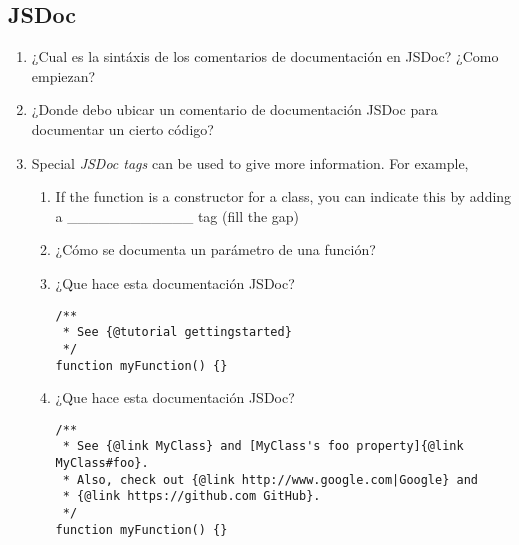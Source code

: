 \subsection{JSDoc}\label{jsdoc}

\begin{enumerate}
\def\labelenumi{\arabic{enumi}.}
\itemsep1pt\parskip0pt
\item
  ¿Cual es la sintáxis de los comentarios de documentación en JSDoc?
  ¿Como empiezan?
\item
  ¿Donde debo ubicar un comentario de documentación JSDoc para
  documentar un cierto código?
\item
  Special \emph{JSDoc tags} can be used to give more information. For
  example,

  \begin{enumerate}
  \def\labelenumii{\arabic{enumii}.}
  \item
    If the function is a constructor for a class, you can indicate this
    by adding a \_\_\_\_\_\_\_\_\_\_\_\_ tag (fill the gap)
  \item
    ¿Cómo se documenta un parámetro de una función?
  \item
    ¿Que hace esta documentación JSDoc?

\begin{verbatim}
/**
 * See {@tutorial gettingstarted} 
 */
function myFunction() {}
\end{verbatim}
  \item
    ¿Que hace esta documentación JSDoc?

\begin{verbatim}
/**
 * See {@link MyClass} and [MyClass's foo property]{@link MyClass#foo}.
 * Also, check out {@link http://www.google.com|Google} and
 * {@link https://github.com GitHub}.
 */
function myFunction() {}
\end{verbatim}
  \end{enumerate}
\end{enumerate}
